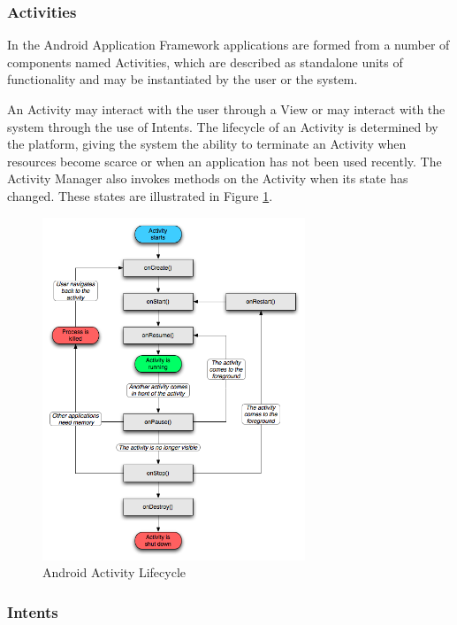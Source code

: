 \subsubsection{Activities}

In the Android Application Framework applications are formed from a number of components named Activities, which are described as standalone units of functionality and may be instantiated by the user or the system. 

An Activity may interact with the user through a View or may interact with the system through the use of Intents. The lifecycle of an Activity is determined by the platform, giving the system the ability to terminate an Activity when resources become scarce or when an application has not been used recently. The Activity Manager also invokes methods on the Activity when its state has changed. These states are illustrated in Figure \ref{activity_lifecycle}. 

\begin{figure}[h!]
\centering
    \includegraphics[width=0.7\textwidth]{research/images/activity_lifecycle.png}
    \caption{Android Activity Lifecycle}%
    \label{activity_lifecycle}
\end{figure}

\subsubsection{Intents}

